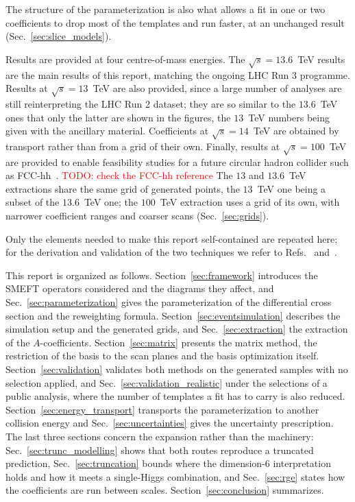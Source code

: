 The structure of the parameterization is also what allows a fit in one or two
coefficients to drop most of the templates and run faster, at an unchanged result
(Sec.~\ref{sec:slice_models}).

Results are provided at four centre-of-mass energies. The $\sqrt{s}=13.6$~TeV results are
the main results of this report, matching the ongoing LHC Run 3 programme. Results at
$\sqrt{s}=13$~TeV are also provided, since a large number of analyses are still
reinterpreting the LHC Run 2 dataset; they are so similar to the $13.6$~TeV ones that only
the latter are shown in the figures, the $13$~TeV numbers being given with the ancillary
material. Coefficients at $\sqrt{s}=14$~TeV are obtained by transport rather than from a
grid of their own. Finally, results at $\sqrt{s}=100$~TeV are provided to enable
feasibility studies for a future circular hadron collider such as
FCC-hh~\cite{FCC:2018vvp}. \textcolor{red}{TODO: check the FCC-hh reference} The $13$ and
$13.6$~TeV extractions share the same grid of generated points, the $13$~TeV one being a
subset of the $13.6$~TeV one; the $100$~TeV extraction uses a grid of its own, with
narrower coefficient ranges and coarser scans (Sec.~\ref{sec:grids}).

Only the elements needed to make this report self-contained are repeated here; for the
derivation and validation of the two techniques we refer to Refs.~\cite{ELR_R5}
and~\cite{HH_nonggf_R5}.

This report is organized as follows. Section~\ref{sec:framework} introduces the SMEFT
operators considered and the diagrams they affect, and Sec.~\ref{sec:parameterization}
gives the parameterization of the differential cross section and the reweighting formula.
Section~\ref{sec:eventsimulation} describes the simulation setup and the generated grids,
and Sec.~\ref{sec:extraction} the extraction of the $A$-coefficients.
Section~\ref{sec:matrix} presents the matrix method, the restriction of the basis to the
scan planes and the basis optimization itself. Section~\ref{sec:validation} validates
both methods on the generated samples with no selection applied, and
Sec.~\ref{sec:validation_realistic} under the selections of a public \HHbbbb analysis,
where the number of templates a fit has to carry is also reduced.
Section~\ref{sec:energy_transport} transports the parameterization to another collision
energy and Sec.~\ref{sec:uncertainties} gives the uncertainty prescription. The last
three sections concern the expansion rather than the machinery:
Sec.~\ref{sec:trunc_modelling} shows that both routes reproduce a truncated prediction,
Sec.~\ref{sec:truncation} bounds where the dimension-6 interpretation holds and how it
meets a single-Higgs combination, and Sec.~\ref{sec:rge} states how the coefficients are
run between scales. Section~\ref{sec:conclusion} summarizes.
